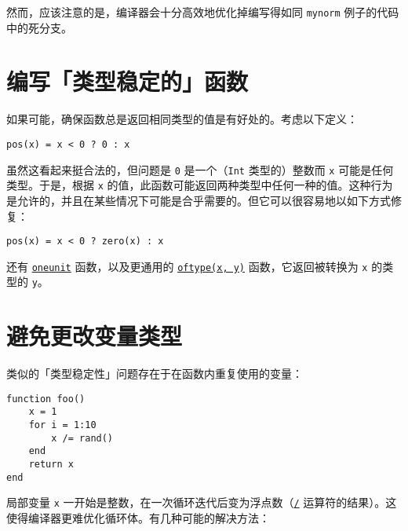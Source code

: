 然而，应该注意的是，编译器会十分高效地优化掉编写得如同 \texttt{mynorm} 例子的代码中的死分支。



\hypertarget{11831339210471490014}{}


\section{编写「类型稳定的」函数}



如果可能，确保函数总是返回相同类型的值是有好处的。考虑以下定义：




\begin{verbatim}
pos(x) = x < 0 ? 0 : x
\end{verbatim}



虽然这看起来挺合法的，但问题是 \texttt{0} 是一个（\texttt{Int} 类型的）整数而 \texttt{x} 可能是任何类型。于是，根据 \texttt{x} 的值，此函数可能返回两种类型中任何一种的值。这种行为是允许的，并且在某些情况下可能是合乎需要的。但它可以很容易地以如下方式修复：




\begin{verbatim}
pos(x) = x < 0 ? zero(x) : x
\end{verbatim}



还有 \hyperlink{2310843180104103470}{\texttt{oneunit}} 函数，以及更通用的 \hyperlink{374166931194490566}{\texttt{oftype(x, y)}} 函数，它返回被转换为 \texttt{x} 的类型的 \texttt{y}。



\hypertarget{6976604449962643011}{}


\section{避免更改变量类型}



类似的「类型稳定性」问题存在于在函数内重复使用的变量：




\begin{verbatim}
function foo()
    x = 1
    for i = 1:10
        x /= rand()
    end
    return x
end
\end{verbatim}



局部变量 \texttt{x} 一开始是整数，在一次循环迭代后变为浮点数（\hyperlink{4103478871488785445}{\texttt{/}} 运算符的结果）。这使得编译器更难优化循环体。有几种可能的解决方法：



